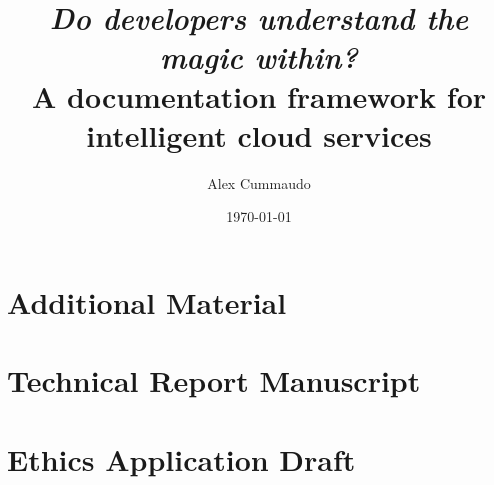 \documentclass[twoside,12pt,titlepage]{book}
\title{\textit{Do developers understand the magic within?}\\
    A documentation framework for intelligent cloud services
}
\author{Alex Cummaudo}
\date{\today}
\begin{document}
\frontmatter


%
%


\mainmatter




%


\appendix
\chapter{Additional Material}
\cleardoublepage


\chapter{Technical Report Manuscript}
\label{appx:tech-report}
\cleardoublepage


\chapter{Ethics Application Draft}
\label{appx:ethics}
\cleardoublepage
\end{document}
